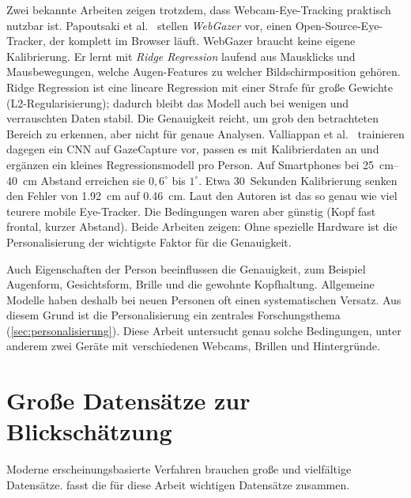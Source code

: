 Zwei bekannte Arbeiten zeigen trotzdem, dass Webcam-Eye-Tracking praktisch
nutzbar ist. Papoutsaki et al.~\cite{papoutsaki2016webgazer} stellen
\emph{WebGazer} vor, einen Open-Source-Eye-Tracker, der komplett im Browser
läuft. WebGazer braucht keine eigene Kalibrierung. Er lernt mit
\emph{Ridge Regression} laufend aus Mausklicks und Mausbewegungen, welche
Augen-Features zu welcher Bildschirmposition gehören. Ridge Regression ist eine
lineare Regression mit einer Strafe für große Gewichte
(L2-Regularisierung); dadurch bleibt das Modell auch bei wenigen und
verrauschten Daten stabil. Die Genauigkeit reicht, um
grob den betrachteten Bereich zu erkennen, aber nicht für genaue Analysen.
Valliappan et al.~\cite{valliappan2020smartphone} trainieren dagegen ein CNN
auf GazeCapture vor, passen es mit Kalibrierdaten an und ergänzen ein kleines
Regressionsmodell pro Person. Auf Smartphones bei
\SIrange{25}{40}{\centi\metre} Abstand erreichen sie $0,6^\circ$ bis $1^\circ$.
Etwa 30~Sekunden Kalibrierung senken den Fehler von \SI{1,92}{\centi\metre} auf
\SI{0,46}{\centi\metre}. Laut den Autoren ist das so genau wie viel teurere
mobile Eye-Tracker. Die Bedingungen waren aber günstig (Kopf fast frontal,
kurzer Abstand). Beide Arbeiten zeigen: Ohne spezielle Hardware ist die
Personalisierung der wichtigste Faktor für die Genauigkeit.

Auch Eigenschaften der Person beeinflussen die Genauigkeit, zum Beispiel
Augenform, Gesichtsform, Brille und die gewohnte Kopfhaltung. Allgemeine
Modelle haben deshalb bei neuen Personen oft einen systematischen Versatz. Aus
diesem Grund ist die Personalisierung ein zentrales Forschungsthema
(\cref{sec:personalisierung}). Diese Arbeit untersucht genau solche
Bedingungen, unter anderem zwei Geräte mit verschiedenen Webcams, Brillen und
Hintergründe.

\section{Große Datensätze zur Blickschätzung}
\label{sec:datensaetze}
Moderne erscheinungsbasierte Verfahren brauchen große und vielfältige
Datensätze.  fasst die für diese Arbeit wichtigen
Datensätze zusammen.

